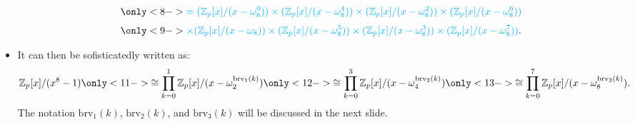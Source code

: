 \begin{frame}
\begin{itemize}
\begin{align*}
    &\quad\only<8->{\color{cyan}= (\mathbb{Z}_{p}[x]/(x-\omega_{8}^{0}))
            \times
            (\mathbb{Z}_{p}[x]/(x-\omega_{8}^{4}))
            \times
            (\mathbb{Z}_{p}[x]/(x-\omega_{8}^{2}))
            \times
            (\mathbb{Z}_{p}[x]/(x-\omega_{8}^{6}))} \\[3pt]
    &\quad\only<9->{\color{cyan}\times (\mathbb{Z}_{p}[x]/(x-\omega_{8}))
            \times
            (\mathbb{Z}_{p}[x]/(x-\omega_{8}^{5}))
            \times
            (\mathbb{Z}_{p}[x]/(x-\omega_{8}^{3}))
            \times
            (\mathbb{Z}_{p}[x]/(x-\omega_{8}^{7}))}.
    \end{align*}

        \item <10->It can then be sofisticatedly written as:
            \[
                \mathbb{Z}_{p}[x]/(x^{8}-1) 
                \only<11->{\cong \prod_{k=0}^{1} \mathbb{Z}_{p}[x]/(x-\omega_{2}^{\mathrm{brv}_{1}(k)})}
                \only<12->{\cong \prod_{k=0}^{3} \mathbb{Z}_{p}[x]/(x-\omega_{4}^{\mathrm{brv}_{2}(k)})}
                \only<13->{\cong \prod_{k=0}^{7} \mathbb{Z}_{p}[x]/(x-\omega_{8}^{\mathrm{brv}_{3}(k)}).}
            \]
            The notation \( \mathrm{brv}_{1}(k) \), \( \mathrm{brv}_{2}(k) \), and \( \mathrm{brv}_{3}(k) \) will be discussed in the next slide.

    \end{itemize}
\end{frame}

